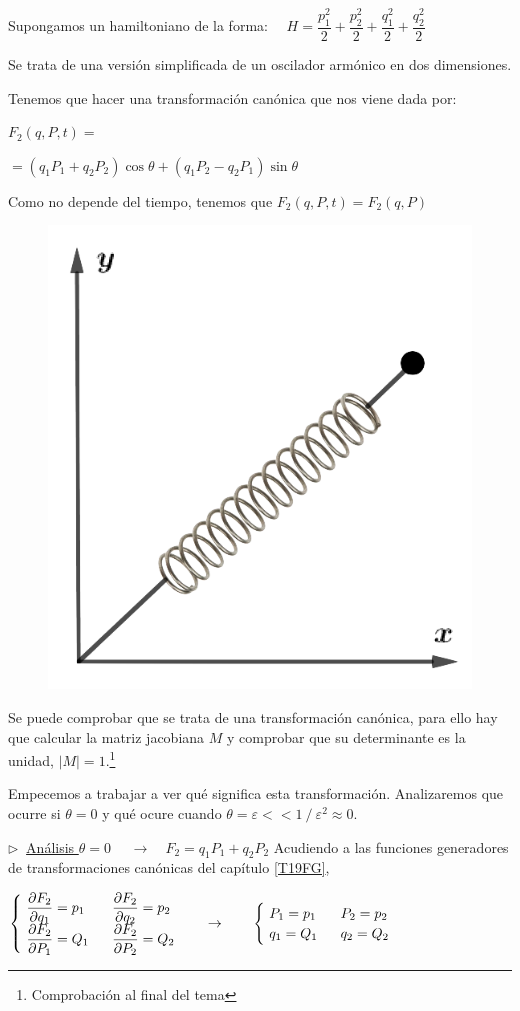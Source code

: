 \begin{example}

Supongamos un hamiltoniano de la forma:
$\quad H=	\dfrac{p^2_1}{2}+ \dfrac{p^2_2}{2}+\dfrac{q^2_1}{2}+\dfrac{q^2_2}{2}$	

\begin{multicols}{2}

\vspace{2mm}Se trata de una versión simplificada de un oscilador armónico en dos dimensiones.

\vspace{2mm}Tenemos que hacer una transformación canónica que nos viene dada por:

\vspace{2mm}$F_2(q,P,t)=$

$=(q_1P_1+q_2P_2)\cos \theta + (q_1P_2-q_2P_1)\sin \theta $

\vspace{2mm}Como no depende del tiempo, tenemos que $F_2(q,P,t)=F_2(q,P)$

\begin{figure}[H]
	\centering
	\includegraphics[width=.3\textwidth]{imagenes/img21-01.png}
\end{figure}
\end{multicols}\end{example}

Se puede comprobar que se trata de una transformación canónica, para ello hay que calcular la matriz jacobiana $M$ y comprobar que su determinante es la unidad, $|M|=1$.\footnote{ Comprobación al final del tema}

Empecemos a trabajar a ver qué significa esta transformación. Analizaremos que ocurre si $\theta =0$ y qué ocure cuando $\theta =\varepsilon << 1 \ / \ \varepsilon^2\approx 0$.


\vspace{5mm} $\triangleright\ $ \underline{Análisis $\theta=0$} $\quad \to \quad F_2=q_1P_1+q_2P_2$ Acudiendo a las funciones generadores de transformaciones canónicas del capítulo \ref{T19FG},

$\begin{cases}
\ \displaystyle \pdv{F_2}{q_1}=p_1 & \ \ \displaystyle \pdv{F_2}{q_2}=p_2 \\
\ \displaystyle \pdv{F_2	}{P_1}=Q_1 & \ \ \displaystyle \pdv{F_2}{P_2}=Q_2
\end{cases} \qquad \to \qquad 
\begin{cases}
\ P_1=p_1 & \ \ P_2=p_2	 \\
\ q_1=Q_1 & \ \ q_2=Q_2
\end{cases}$

